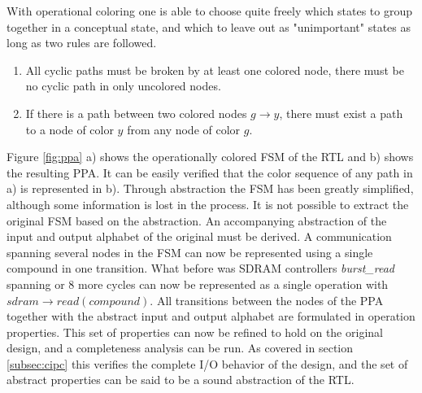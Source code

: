 With operational coloring one is able to choose quite freely which states to group together in a conceptual state, and which to leave out as "unimportant" states as long as two rules are followed. 
\begin{enumerate}
 \item All cyclic paths must be broken by at least one colored node, there must be no cyclic path in only uncolored nodes. 
 \item If there is a path between two colored nodes $g\rightarrow y$, there must exist a path to a node of color $y$ from any node of color $g$. 
\end{enumerate} 

Figure \ref{fig:ppa} a) shows the operationally colored FSM of the RTL and b) shows the resulting PPA. It can be easily verified that the color sequence of any path in a) is represented in b). Through abstraction the FSM has been greatly simplified, although some information is lost in the process. It is not possible to extract the original FSM based on the abstraction. An accompanying abstraction of the input and output alphabet of the original must be derived. A communication spanning several nodes in the FSM can now be represented using a single compound in one transition. What before was SDRAM controllers \textit{burst\_read} spanning or 8 more cycles can now be represented as a single operation with $sdram\rightarrow read(compound)$. All transitions between the nodes of the PPA together with the abstract input and output alphabet are formulated in operation properties. This set of properties can now be refined to hold on the original design, and a completeness analysis can be run. As covered in section \ref{subsec:cipc} this verifies the complete I/O behavior of the design, and the set of abstract properties can be said to be a sound abstraction of the RTL.  




